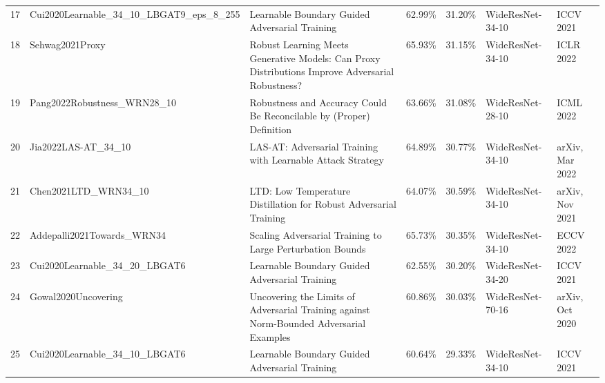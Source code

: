 \begin{table}[]
\begin{tabular}{lllllll}
  17 & Cui2020Learnable\_34\_10\_LBGAT9\_eps\_8\_255 & Learnable Boundary Guided Adversarial Training                                                                     & 62.99\%        & 31.20\%         & WideResNet-34-10                               & ICCV 2021            \\
  18 & Sehwag2021Proxy                               & Robust Learning Meets Generative Models: Can Proxy Distributions Improve Adversarial Robustness?                   & 65.93\%        & 31.15\%         & WideResNet-34-10                               & ICLR 2022            \\
  19 & Pang2022Robustness\_WRN28\_10                 & Robustness and Accuracy Could Be Reconcilable by (Proper) Definition                                               & 63.66\%        & 31.08\%         & WideResNet-28-10                               & ICML 2022            \\
  20 & Jia2022LAS-AT\_34\_10                         & LAS-AT: Adversarial Training with Learnable Attack Strategy                                                        & 64.89\%        & 30.77\%         & WideResNet-34-10                               & arXiv, Mar 2022      \\
  21 & Chen2021LTD\_WRN34\_10                        & LTD: Low Temperature Distillation for Robust Adversarial Training                                                  & 64.07\%        & 30.59\%         & WideResNet-34-10                               & arXiv, Nov 2021      \\
  22 & Addepalli2021Towards\_WRN34                   & Scaling Adversarial Training to Large Perturbation Bounds                                                          & 65.73\%        & 30.35\%         & WideResNet-34-10                               & ECCV 2022            \\
  23 & Cui2020Learnable\_34\_20\_LBGAT6              & Learnable Boundary Guided Adversarial Training                                                                     & 62.55\%        & 30.20\%         & WideResNet-34-20                               & ICCV 2021            \\
  24 & Gowal2020Uncovering                           & Uncovering the Limits of Adversarial Training against Norm-Bounded Adversarial Examples                            & 60.86\%        & 30.03\%         & WideResNet-70-16                               & arXiv, Oct 2020      \\
  25 & Cui2020Learnable\_34\_10\_LBGAT6              & Learnable Boundary Guided Adversarial Training                                                                     & 60.64\%        & 29.33\%         & WideResNet-34-10                               & ICCV 2021            \\

\end{tabular}
\end{table}
